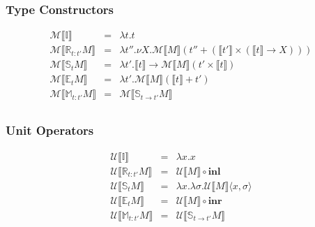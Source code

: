 \documentclass{article}[11pt]
\begin{document}
\subsubsection{Type Constructors}
\begin{eqnarray*}
\mathcal{M}\llbracket{}\mathbb{I}\rrbracket &=& \lambda t . t\\
\mathcal{M}\llbracket{}\mathbb{R}_{t:t'}M\rrbracket &=& \lambda t'' . \nu{}X . \mathcal{M}\llbracket{}M\rrbracket (t'' + (\llbracket{}t'\rrbracket \times (\llbracket{}t\rrbracket \rightarrow X)))\\
\mathcal{M}\llbracket{}\mathbb{S}_t M\rrbracket &=& \lambda t' . \llbracket{}t\rrbracket \rightarrow \mathcal{M}\llbracket{}M\rrbracket (t' \times \llbracket{}t\rrbracket)\\
\mathcal{M}\llbracket{}\mathbb{E}_t M\rrbracket &=& \lambda{} t' . \mathcal{M}\llbracket{}M\rrbracket (\llbracket{}t\rrbracket + t')\\
\mathcal{M}\llbracket{}\mathbb{M}_{t:t'} M\rrbracket &=& \mathcal{M}\llbracket{}\mathbb{S}_{t\rightarrow{}t'} M\rrbracket\\
\end{eqnarray*}

\subsubsection{Unit Operators}
\begin{eqnarray*}
\mathcal{U}\llbracket{}\mathbb{I}\rrbracket &=& \lambda x . x\\
\mathcal{U}\llbracket{}\mathbb{R}_{t:t'}M\rrbracket &=& \mathcal{U}\llbracket{}M\rrbracket \circ \mathbf{inl}\\
\mathcal{U}\llbracket{}\mathbb{S}_t M\rrbracket &=& \lambda x . \lambda \sigma . \mathcal{U}\llbracket{}M\rrbracket \langle x,\sigma \rangle\\
\mathcal{U}\llbracket{}\mathbb{E}_t M\rrbracket &=& \mathcal{U}\llbracket{}M\rrbracket \circ \mathbf{inr}\\
\mathcal{U}\llbracket{}\mathbb{M}_{t:t'} M\rrbracket &=& \mathcal{U}\llbracket{}\mathbb{S}_{t\rightarrow{}t'} M\rrbracket\\
\end{eqnarray*}
\end{document}
